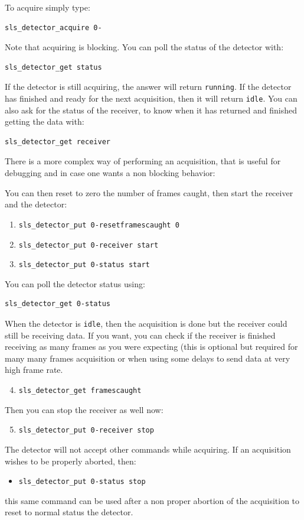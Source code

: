 \documentclass{article}
\begin{document}
To acquire simply type:
\begin{verbatim}
sls_detector_acquire 0-
\end{verbatim}
Note that acquiring is blocking.
You can poll the status of the detector with:
\begin{verbatim}
sls_detector_get status
\end{verbatim}
If the detector is still acquiring, the answer will return {\tt{running}}. If the detector has finished and ready for the next acquisition, then it will return {\tt{idle}}.
You can also ask for the status of the receiver, to know when it has returned and finished getting the data with:
\begin{verbatim}
sls_detector_get receiver
\end{verbatim}

There is a more complex way of performing an acquisition, that is useful for debugging and in case one wants a non blocking behavior: 

You can then reset to zero the number of frames caught, then  start the receiver and the detector:
\begin{enumerate}
\item {\tt{sls\_detector\_put 0-resetframescaught 0}} 
\item {\tt{sls\_detector\_put 0-receiver start}} 
\item {\tt{sls\_detector\_put 0-status start}} 
\end{enumerate}

You can poll the detector status using:
\begin{verbatim}
sls_detector_get 0-status 
\end{verbatim}
When the detector is {\tt{idle}}, then the acquisition is done but the receiver could still be receiving data. If you want, you can check if the receiver is finished receiving as many frames as you were expecting (this is optional but required for many many frames acquisition or when using some delays to send data at very high frame rate.
\begin{enumerate}
\setcounter{enumi}{3}
\item {\tt{sls\_detector\_get framescaught}} 
\end{enumerate}
Then you can stop the receiver as well now:
\begin{enumerate}
\setcounter{enumi}{4}
\item {\tt{sls\_detector\_put 0-receiver stop}} 
\end{enumerate}

The detector will not accept other commands while acquiring. If an acquisition wishes to be properly aborted, then:
\begin{itemize}
\item {\tt{sls\_detector\_put 0-status stop}} 
\end{itemize}
this same command can be used after a non proper abortion of the acquisition to reset to normal status the detector.
\end{document}
